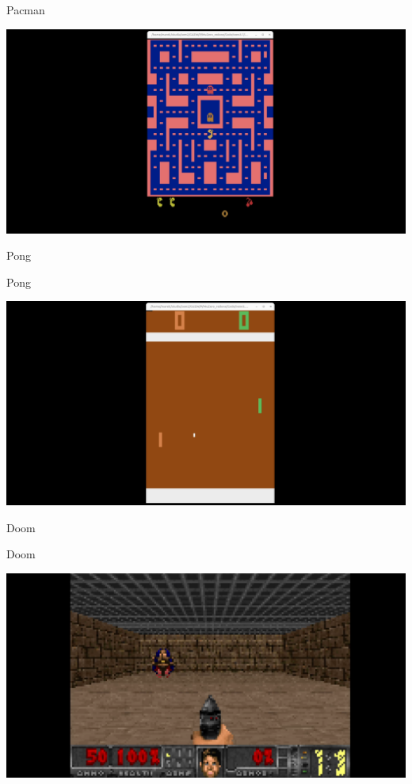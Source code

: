 \begin{frame}{Pacman}
    \begin{center}
        \includegraphics[height=.9\textheight,keepaspectratio]{images/pacman_vid.png}
    \end{center}
\end{frame}
\begin{frame}{Pong}
\end{frame}
\begin{frame}{Pong}
    \begin{center}
        \includegraphics[height=.9\textheight,keepaspectratio]{images/pong_vid.png}
    \end{center}
\end{frame}
\begin{frame}{Doom}
\end{frame}
\begin{frame}{Doom}
    \begin{center}
        \includegraphics[height=.9\textheight,keepaspectratio]{images/doom_vid.png}
    \end{center}
\end{frame}